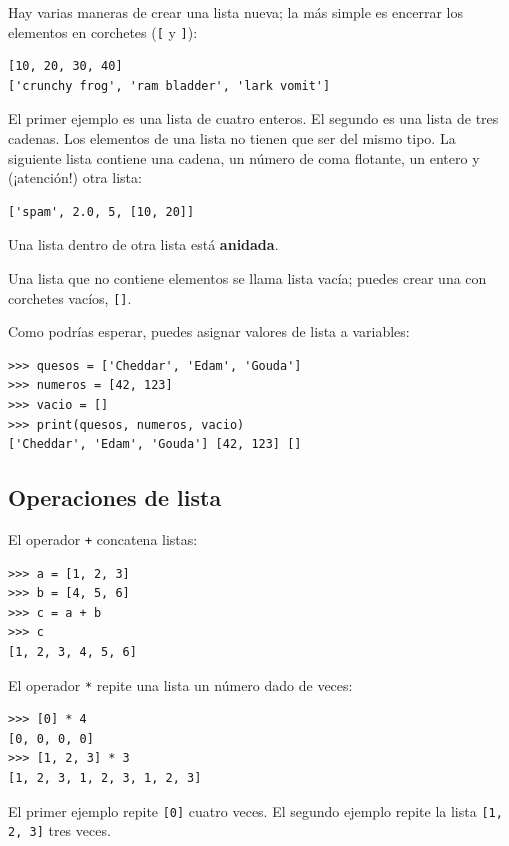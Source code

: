 Hay varias maneras de crear una lista nueva; la más simple es
encerrar los elementos en corchetes (\verb"[" y \verb"]"):

\begin{Verbatim}[frame=single]
[10, 20, 30, 40]
['crunchy frog', 'ram bladder', 'lark vomit']
\end{Verbatim}
%
El primer ejemplo es una lista de cuatro enteros.  El segundo es una lista de
tres cadenas.  Los elementos de una lista no tienen que ser del mismo tipo.
La siguiente lista contiene una cadena, un número de coma flotante, un entero y
(¡atención!) otra lista:

\begin{Verbatim}[frame=single]
['spam', 2.0, 5, [10, 20]]
\end{Verbatim}
%
Una lista dentro de otra lista está \textbf{ anidada}.

Una lista que no contiene elementos se
llama lista vacía; puedes crear una con corchetes
vacíos, \verb"[]".

Como podrías esperar, puedes asignar valores de lista a variables:

\begin{Verbatim}[frame=single]
>>> quesos = ['Cheddar', 'Edam', 'Gouda']
>>> numeros = [42, 123]
>>> vacio = []
>>> print(quesos, numeros, vacio)
['Cheddar', 'Edam', 'Gouda'] [42, 123] []
\end{Verbatim}
%

\subsection{Operaciones de lista}

El operador \texttt{+} concatena listas:

\begin{Verbatim}[frame=single]
>>> a = [1, 2, 3]
>>> b = [4, 5, 6]
>>> c = a + b
>>> c
[1, 2, 3, 4, 5, 6]
\end{Verbatim}
%
El operador \texttt{*} repite una lista un número dado de veces:

\begin{Verbatim}[frame=single]
>>> [0] * 4
[0, 0, 0, 0]
>>> [1, 2, 3] * 3
[1, 2, 3, 1, 2, 3, 1, 2, 3]
\end{Verbatim}
%
El primer ejemplo repite \texttt{[0]} cuatro veces.  El segundo ejemplo
repite la lista \texttt{[1, 2, 3]} tres veces.


